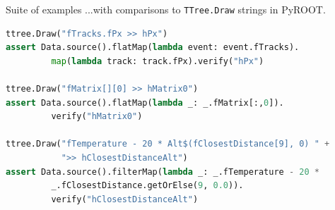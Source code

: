 \documentclass{beamer}
\begin{document}
\begin{frame}[fragile]{Suite of examples}
\vspace{0.5 cm}
...with comparisons to {\tt\small TTree.Draw} strings in PyROOT.

\vspace{0.25 cm}
\begin{lstlisting}[language=python, basicstyle=\ttfamily\scriptsize]
ttree.Draw("fTracks.fPx >> hPx")
assert Data.source().flatMap(lambda event: event.fTracks).
         map(lambda track: track.fPx).verify("hPx")

ttree.Draw("fMatrix[][0] >> hMatrix0")
assert Data.source().flatMap(lambda _: _.fMatrix[:,0]).
         verify("hMatrix0")

ttree.Draw("fTemperature - 20 * Alt$(fClosestDistance[9], 0) " +
           ">> hClosestDistanceAlt")
assert Data.source().filterMap(lambda _: _.fTemperature - 20 *
         _.fClosestDistance.getOrElse(9, 0.0)).
         verify("hClosestDistanceAlt")
\end{lstlisting}
\end{frame}
\end{document}
